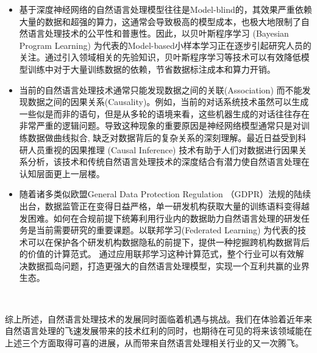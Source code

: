 \documentclass[graybox,envcountchap,sectrefs]{svmono}
\begin{document}
\begin{itemize}
  \item 基于深度神经网络的自然语言处理模型往往是Model-blind的，其效果严重依赖大量的数据和超强的算力，这通常会导致极高的模型成本，也极大地限制了自然语言处理技术的公平性和普惠性。因此，以贝叶斯程序学习 (Bayesian Program Learning) \cite{lake2015human}为代表的Model-based小样本学习正在逐步引起研究人员的关注。通过引入领域相关的先验知识，贝叶斯程序学习等技术可以有效降低模型训练中对于大量训练数据的依赖，节省数据标注成本和算力开销。
  \item 当前的自然语言处理技术通常只能发现数据之间的关联(Association) 而不能发现数据之间的因果关系(Causality)。例如，当前的对话系统技术虽然可以生成一些似是而非的语句，但是从多轮的语境来看，这些机器生成的对话往往存在非常严重的逻辑问题。导致这种现象的重要原因是神经网络模型通常只是对训练数据做曲线拟合, 缺乏对数据背后的复杂关系的深刻理解。最近日益受到科研人员重视的因果推理 (Causal Inference) \cite{pearl2010introduction} 技术有助于人们对数据进行因果关系分析，该技术和传统自然语言处理技术的深度结合有潜力使自然语言处理在认知层面更上一层楼。
  \item 随着诸多类似欧盟General Data Protection Regulation （GDPR）法规的陆续出台，数据监管正在变得日益严格，单一研发机构获取大量的训练语料变得越发困难。如何在合规前提下统筹利用行业内的数据助力自然语言处理的研发任务是当前需要研究的重要课题。以联邦学习(Federated Learning) \cite{yang2019federated, jiang2019federated} 为代表的技术可以在保护各个研发机构数据隐私的前提下，提供一种挖掘跨机构数据背后的价值的计算范式。 通过应用联邦学习这种计算范式，整个行业可以有效解决数据孤岛问题，打造更强大的自然语言处理模型，实现一个互利共赢的业界生态。
\end{itemize}


综上所述，自然语言处理技术的发展同时面临着机遇与挑战。我们在体验着近年来自然语言处理的飞速发展带来的技术红利的同时，也期待在可见的将来该领域能在上述三个方面取得可喜的进展，从而带来自然语言处理相关行业的又一次腾飞。






\backmatter%
%
%
\printindex

\end{document}
